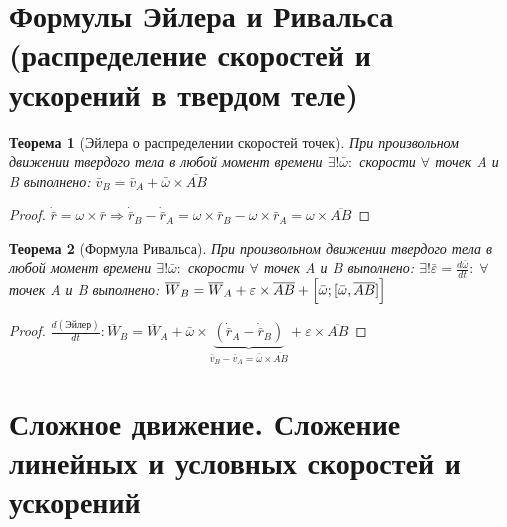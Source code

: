 \documentclass[12pt]{article}
\newtheorem{theorem}{Теорема}
\begin{document}
\section{Формулы Эйлера и Ривальса (распределение скоростей и ускорений в твердом теле)}
	\vspace{-10pt}
	\begin{theorem}[Эйлера о распределении скоростей точек]
		При произвольном движении твердого тела в любой момент времени $\exists! \bar{\omega}:$ скорости $\forall$ точек A и B выполнено: $\bar{v}_B = \bar{v}_A + \bar{\omega}\times \overline{AB} $  
	\end{theorem}
\vspace{-10pt}
	\begin{proof}
			$\dot{\bar{r}} = \omega\times \bar{r}  \Rightarrow 
			\dot{\bar{r}}_B - \dot{\bar{r}}_A =
			 \omega\times \bar{r}_B - \omega\times \bar{r}_A = \omega\times\overline{AB} $
	\end{proof}
	\begin{theorem}[Формула Ривальса]
		При произвольном движении твердого тела в любой момент времени $\exists! \bar{\omega}:$ скорости $\forall$ точек A и B выполнено: $\exists! \bar{\varepsilon} = \frac{d\bar{\omega}}{dt}: \; \forall $ точек A и B выполнено: 
		$\overline{W}_B = \overline{W}_A + \varepsilon \times \overline{AB}+ \Bigl[\bar{\omega}; [\bar{\omega}, \overline{AB} ] \Bigr] $ 
	\end{theorem}
	\begin{proof}
		 $\frac{d(\text{Эйлер})}{dt}:\overline{W}_B = \overline{W}_A + \bar{\omega} \times \underbrace{(\dot{\bar{r}}_A - \dot{\bar{r}}_B)}_{\bar{v}_B - \bar{v}_A = \bar{\omega}\times \overline{AB}} + \varepsilon \times \overline{AB}$
		
	\end{proof}
\vspace{-20pt}
\section{Сложное движение. Сложение линейных и условных скоростей и ускорений}
\end{document}
